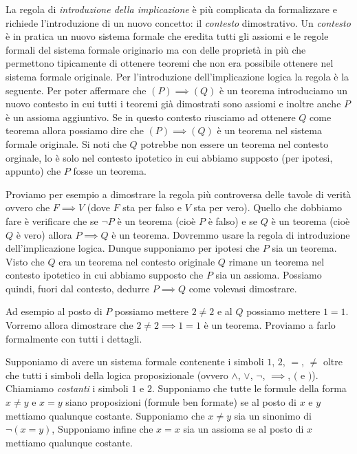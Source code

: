 La regola di \emph{introduzione della implicazione} è più complicata 
%
da formalizzare e richiede l'introduzione di un nuovo concetto:
il \emph{contesto} dimostrativo.
%
%
Un \emph{contesto} è in pratica un nuovo sistema formale che 
eredita tutti gli assiomi e le regole formali del sistema formale 
originario ma con delle proprietà in più che permettono tipicamente di 
ottenere teoremi che non era possibile ottenere nel sistema formale 
originale.
Per l'introduzione dell'implicazione logica la regola 
è la seguente. Per poter affermare che $(P)\implies (Q)$ 
è un teorema introduciamo un nuovo contesto in cui 
tutti i teoremi già dimostrati sono assiomi e inoltre 
anche $P$ è un assioma aggiuntivo. 
Se in questo contesto riusciamo ad ottenere $Q$ come
teorema allora possiamo dire che $(P)\implies (Q)$ è un teorema 
nel sistema formale originale.
Si noti che $Q$ potrebbe non essere un teorema nel contesto 
orginale, lo è solo nel contesto ipotetico in cui abbiamo 
supposto (per ipotesi, appunto) che $P$ fosse un teorema.

Proviamo per esempio a dimostrare la regola più controversa
delle tavole di verità ovvero
che $F\implies V$ (dove $F$ sta per falso e 
$V$ sta per vero). 
Quello che dobbiamo fare è verificare che se $\lnot P$ 
è un teorema (cioè $P$ è falso) e se $Q$ è un teorema 
(cioè $Q$ è vero) allora $P\implies Q$ è un teorema.
Dovremmo usare la regola di introduzione dell'implicazione logica.
Dunque supponiamo per ipotesi che $P$ sia un teorema. 
Visto che $Q$ era un teorema nel contesto originale 
$Q$ rimane un teorema nel contesto ipotetico in cui 
abbiamo supposto che $P$ sia un assioma.
Possiamo quindi, fuori dal contesto, dedurre $P\implies Q$ 
come volevasi dimostrare.

Ad esempio al posto di $P$ possiamo mettere $2\neq 2$ 
e al $Q$ possiamo mettere $1=1$. 
Vorremo allora dimostrare che $2\neq 2 \implies 1=1$ 
è un teorema.
Proviamo a farlo formalmente con tutti i dettagli.

Supponiamo di avere un sistema formale 
contenente i simboli $1$, $2$, $=$, $\neq$ oltre che
tutti i simboli della logica proposizionale 
(ovvero $\land$, $\lor$, $\lnot$, $\implies$, $($ e $)$).
Chiamiamo \emph{costanti} i simboli $1$ e $2$.
Supponiamo che tutte le formule della forma 
$x\neq y$ e $x=y$ siano proposizioni 
(formule ben formate) se al posto di $x$ e $y$ 
mettiamo qualunque costante. 
Supponiamo che $x\neq y$ sia un sinonimo di $\lnot (x=y)$,
Supponiamo infine che $x=x$ sia un assioma se al posto 
di $x$ mettiamo qualunque costante.

